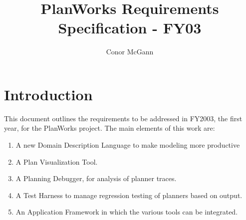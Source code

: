 \documentclass[twoside, 11pt]{article}
\author{Conor McGann}
\title{PlanWorks Requirements Specification - FY03}
\begin{document}
\maketitle

\section{Introduction}
This document outlines the requirements to be addressed in FY2003, the first year, for the PlanWorks project. The main elements of this work are:
\begin{enumerate}
\item A new Domain Description Language to make modeling more productive
\item A Plan Visualization Tool.
\item A Planning Debugger, for analysis of planner traces.
\item A Test Harness to manage regression testing of planners based on output.
\item An Application Framework in which the various tools can be integrated.
\end{enumerate}
\end{document}
